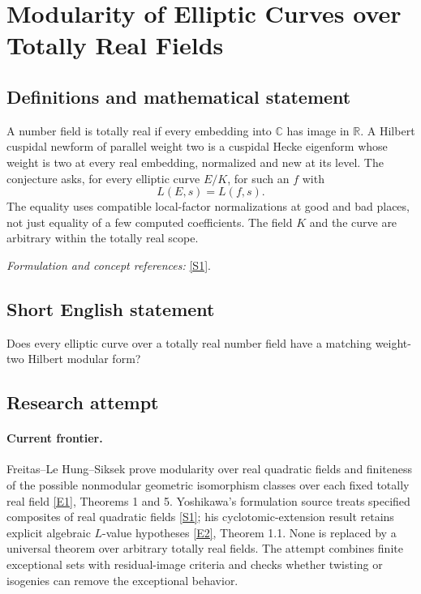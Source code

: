 \documentclass[11pt,a4paper]{article}
\newcommand{\R}{\mathbb{R}}
\newcommand{\C}{\mathbb{C}}
\newcommand{\sref}[2]{\hyperlink{source:#1:#2}{[S#2]}}
\newcommand{\eref}[2]{\hyperlink{extra:#1:#2}{[E#2]}}
\newif\ifshowcatalogue
\newcommand{\cataloguescope}[1]{\ifshowcatalogue
 \paragraph{Exact scope in the supplied catalogue.}
 \begin{quote}\small #1\end{quote}\fi}
\numberwithin{equation}{section}
\begin{document}
\setcounter{section}{0}
\clearpage
\section*{\texorpdfstring{Modularity of Elliptic Curves over Totally Real Fields}{Modularity of Elliptic Curves over Totally Real Fields}}\label{30006706}
\subsection{Definitions and mathematical statement}
A number field is totally real if every embedding into $\C$ has image in $\R$. A Hilbert cuspidal newform of parallel weight two is a cuspidal Hecke eigenform whose weight is two at every real embedding, normalized and new at its level. The conjecture asks, for every elliptic curve $E/K$, for such an $f$ with
\[
 L(E,s)=L(f,s).
\]
The equality uses compatible local-factor normalizations at good and bad places, not just equality of a few computed coefficients. The field $K$ and the curve are arbitrary within the totally real scope.
\par\smallskip\textit{Formulation and concept references:} \sref{30006706}{1}.
\cataloguescope{For every totally real number field K and every elliptic curve E over K, prove that there is a Hilbert cuspidal newform f over K of parallel weight 2 satisfying L(E,s)=L(f,s).}
\subsection{Short English statement}
Does every elliptic curve over a totally real number field have a matching weight-two Hilbert modular form?
\subsection{Research attempt}

\paragraph{Current frontier.}
Freitas--Le Hung--Siksek prove modularity over real quadratic fields and finiteness of the possible nonmodular geometric isomorphism classes over each fixed totally real field \eref{30006706}{1}, Theorems 1 and 5. Yoshikawa's formulation source treats specified composites of real quadratic fields \sref{30006706}{1}; his cyclotomic-extension result retains explicit algebraic $L$-value hypotheses \eref{30006706}{2}, Theorem 1.1. None is replaced by a universal theorem over arbitrary totally real fields. The attempt combines finite exceptional sets with residual-image criteria and checks whether twisting or isogenies can remove the exceptional behavior.
\end{document}
